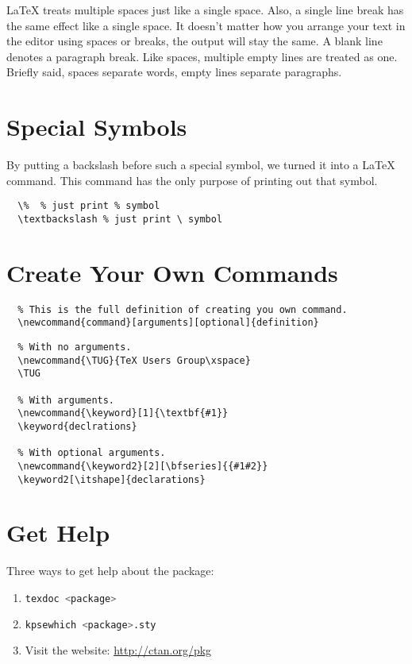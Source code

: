 LaTeX treats multiple spaces just like a single space.
Also, a single line break has the same effect like a single space.
It doesn't matter how you arrange your text in the editor using spaces or breaks, the output will stay the same.
A blank line denotes a paragraph break.
Like spaces, multiple empty lines are treated as one.
Briefly said, spaces separate words, empty lines separate paragraphs.


\section{Special Symbols}
\label{sec:special-symbols}
By putting a backslash before such a special symbol, we turned it into a LaTeX command.
This command has the only purpose of printing out that symbol.



\begin{lstlisting}
  \%  % just print % symbol
  \textbackslash % just print \ symbol
\end{lstlisting}




\section{Create Your Own Commands}

\begin{lstlisting}
  % This is the full definition of creating you own command.
  \newcommand{command}[arguments][optional]{definition}
\end{lstlisting}


\begin{lstlisting}
  % With no arguments.
  \newcommand{\TUG}{TeX Users Group\xspace}
  \TUG

  % With arguments.
  \newcommand{\keyword}[1]{\textbf{#1}}
  \keyword{declrations}

  % With optional arguments.
  \newcommand{\keyword2}[2][\bfseries]{{#1#2}}
  \keyword2[\itshape]{declarations}
\end{lstlisting}


\section{Get Help}
Three ways to get help about the package:
\begin{enumerate}
  
\item 
\begin{lstlisting}[language=sh]
    texdoc <package>
\end{lstlisting}

\item
\begin{lstlisting}[language=sh]
    kpsewhich <package>.sty
\end{lstlisting}

\item Visit the website: \url{http://ctan.org/pkg}

\end{enumerate}

